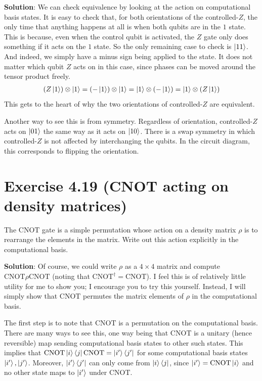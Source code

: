 \documentclass{book}
\begin{document}
    \textbf{Solution}: We can check equivalence by looking at the action on computational basis states. It is easy to check that, for both orientations of the controlled-$Z$, the only time that anything happens at all is when both qubits are in the $1$ state. This is because, even when the control qubit is activated, the $Z$ gate only does something if it acts on the $1$ state. So the only remaining case to check is $\ket{11}$. And indeed, we simply have a minus sign being applied to the state. It does not matter which qubit $Z$ acts on in this case, since phases can be moved around the tensor product freely.
    \begin{align}
        (Z\ket{1}) \otimes \ket{1} = (-\ket{1}) \otimes \ket{1} = \ket{1} \otimes (-\ket{1}) = \ket{1} \otimes (Z\ket{1})
    \end{align}
    This gets to the heart of why the two orientations of controlled-$Z$ are equivalent. 

    Another way to see this is from symmetry. Regardless of orientation, controlled-$Z$ acts on $\ket{01}$ the same way as it acts on $\ket{10}$. There is a swap symmetry in which controlled-$Z$ is not affected by interchanging the qubits. In the circuit diagram, this corresponds to flipping the orientation.

\section*{Exercise 4.19 (CNOT acting on density matrices)}
    The $\mathrm{CNOT}$ gate is a simple permutation whose action on a density matrix $\rho$ is to rearrange the elements in the matrix. Write out this action explicitly in the computational basis. 

    \textbf{Solution}: Of course, we could write $\rho$ as a $4 \times 4$ matrix and compute $\mathrm{CNOT} \rho \mathrm{CNOT}$ (noting that $\mathrm{CNOT}^\dagger = \mathrm{CNOT}$). I feel this is of relatively little utility for me to show you; I encourage you to try this yourself. Instead, I will simply show that $\mathrm{CNOT}$ permutes the matrix elements of $\rho$ in the computational basis. 

    The first step is to note that $\mathrm{CNOT}$ is a permutation on the computational basis. There are many ways to see this, one way being that $\mathrm{CNOT}$ is a unitary (hence reversible) map sending computational basis states to other such states. This implies that $\mathrm{CNOT}\ket{i}\bra{j}\mathrm{CNOT} = \ket{i'}\bra{j'}$ for some computational basis states $\ket{i'}, \ket{j'}$. Moreover, $\ket{i'}\bra{j'}$ can only come from $\ket{i}\bra{j}$, since $\ket{i'} = \mathrm{CNOT} \ket{i}$ and no other state maps to $\ket{i'}$ under $\mathrm{CNOT}$.
\end{document}
